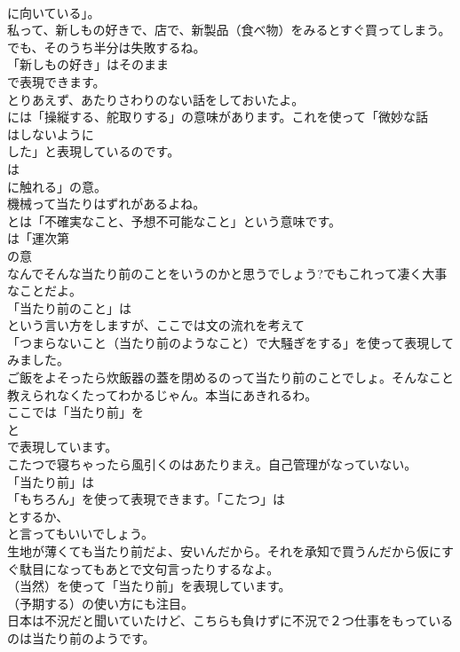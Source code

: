 \documentclass[8pt]{extreport}
\begin{document}
\begin{CJK}{UTF8}{min}
\\	に向いている」。	
\\	私って、新しもの好きで、店で、新製品（食べ物）をみるとすぐ買ってしまう。でも、そのうち半分は失敗するね。 
\\	「新しもの好き」はそのまま
\\	で表現できます。	
\\	とりあえず、あたりさわりのない話をしておいたよ。 
\\	には「操縦する、舵取りする」の意味があります。これを使って「微妙な話
\\	はしないように
\\	した」と表現しているのです。
\\	は
\\	に触れる」の意。	
\\	機械って当たりはずれがあるよね。 
\\	とは「不確実なこと、予想不可能なこと」という意味です。 
\\	は「運次第
\\	の意	
\\	なんでそんな当たり前のことをいうのかと思うでしょう?でもこれって凄く大事なことだよ。 
\\	「当たり前のこと」は
\\	という言い方をしますが、ここでは文の流れを考えて
\\	「つまらないこと（当たり前のようなこと）で大騒ぎをする」を使って表現してみました。	
\\	ご飯をよそったら炊飯器の蓋を閉めるのって当たり前のことでしょ。そんなこと教えられなくたってわかるじゃん。本当にあきれるわ。 
\\	ここでは「当たり前」を 
\\	と 
\\	で表現しています。	
\\	こたつで寝ちゃったら風引くのはあたりまえ。自己管理がなっていない。 
\\	「当たり前」は
\\	「もちろん」を使って表現できます。「こたつ」は
\\	とするか、
\\	と言ってもいいでしょう。	
\\	生地が薄くても当たり前だよ、安いんだから。それを承知で買うんだから仮にすぐ駄目になってもあとで文句言ったりするなよ。 
\\	（当然）を使って「当たり前」を表現しています。
\\	（予期する）の使い方にも注目。	
\\	日本は不況だと聞いていたけど、こちらも負けずに不況で２つ仕事をもっているのは当たり前のようです。 

\end{CJK}
\end{document}
